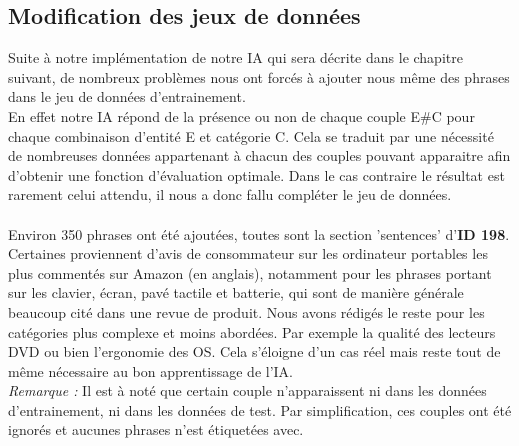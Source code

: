 \documentclass[12pt ,a4paper ]{article}
\begin{document}
\begin{multicols}{2}
\subsection{Modification des jeux de données}
Suite à notre implémentation de notre IA qui sera décrite dans le chapitre suivant, de nombreux problèmes nous ont forcés à ajouter nous même des phrases dans le jeu de données d'entrainement.\\

En effet notre IA répond de la présence ou non de chaque couple E\#C pour chaque combinaison d'entité E et catégorie C. Cela se traduit par une nécessité de nombreuses données appartenant à chacun des couples pouvant apparaitre afin d'obtenir une fonction d'évaluation optimale. Dans le cas contraire le résultat est rarement celui attendu, il nous a donc fallu compléter le jeu de données.

\paragraph{}
Environ 350 phrases ont été ajoutées, toutes sont la section 'sentences' d'\textbf{ID 198}. Certaines proviennent d'avis de consommateur sur les ordinateur portables les plus commentés sur Amazon (en anglais), notamment pour les phrases portant sur les clavier, écran, pavé tactile et batterie, qui sont de manière générale beaucoup cité dans une revue de produit. Nous avons rédigés le reste pour les catégories plus complexe et moins abordées. Par exemple la qualité des lecteurs DVD ou bien l'ergonomie des OS. Cela s'éloigne d'un cas réel mais reste tout de même nécessaire au bon apprentissage de l'IA. \\ 

\noindent \textit{Remarque : } Il est à noté que certain couple n'apparaissent ni dans les données d'entrainement, ni dans les données de test. Par simplification, ces couples ont été ignorés et aucunes phrases n'est étiquetées avec.


\end{multicols}
\end{document}
